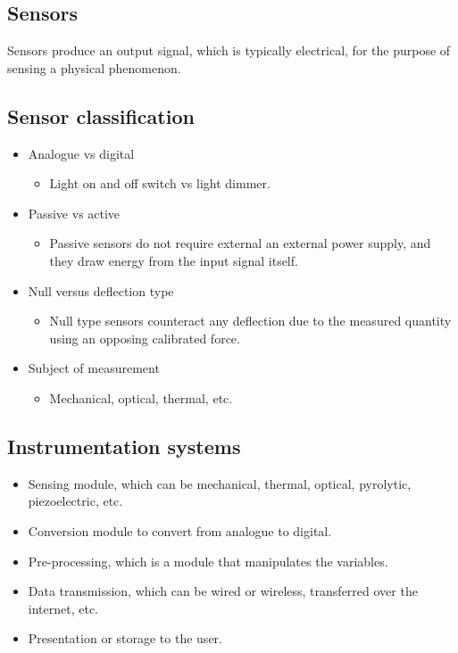\documentclass[11pt]{article}
\begin{document}
\subsection{Sensors}
\label{sec:org558aab8}
Sensors produce an output signal, which is typically electrical, for the purpose of sensing a physical phenomenon.
\subsection{Sensor classification}
\label{sec:org9235efd}
\begin{itemize}
\item Analogue vs digital
\begin{itemize}
\item Light on and off switch vs light dimmer.
\end{itemize}
\item Passive vs active
\begin{itemize}
\item Passive sensors do not require external an external power supply, and they draw energy from the input signal itself.
\end{itemize}
\item Null versus deflection type
\begin{itemize}
\item Null type sensors counteract any deflection due to the measured quantity using an opposing calibrated force.
\end{itemize}
\item Subject of measurement
\begin{itemize}
\item Mechanical, optical, thermal, etc.
\end{itemize}
\end{itemize}
\subsection{Instrumentation systems}
\label{sec:org1fbe74f}
\begin{itemize}
\item Sensing module, which can be mechanical, thermal, optical, pyrolytic, piezoelectric, etc.
\item Conversion module to convert from analogue to digital.
\item Pre-processing, which is a module that manipulates the variables.
\item Data transmission, which can be wired or wireless, transferred over the internet, etc.
\item Presentation or storage to the user.
\end{itemize}
\end{document}

